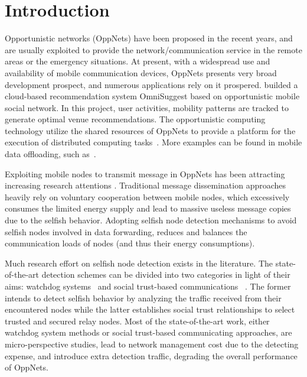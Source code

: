 \section{Introduction}
\label{sec:intro}
Opportunistic networks (OppNets)
have been proposed in the recent years,
and are usually exploited to provide the network/communication service
in the remote areas
or the emergency situations.
At present, with a widespread use and
availability of mobile communication devices,
OppNets presents very broad development prospect,
and numerous applications rely on it prospered.
\cite{DBLP:journals/tsc/KhalidKKZ14} builded a
cloud-based recommendation system OmniSuggest
based on opportunistic mobile social network.
In this project, user activities,
mobility patterns are tracked to
generate optimal venue recommendations.
The opportunistic computing technology utilize
the shared resources of OppNets to
provide a platform for the execution
of distributed computing tasks~\cite{DBLP:journals/tmc/ChatzopoulosAKH18}.
More examples can be found in mobile data offloading,
such as~\cite{DBLP:journals/tmc/HanHKMSS12,
DBLP:journals/tmc/LiQJHW014}.

Exploiting mobile nodes to transmit message in
OppNets has been attracting
increasing research attentions
\cite{DBLP:conf/sigcomm/SouzaMSMCC16,
DBLP:conf/mobicom/RadenkovicH17,
DBLP:journals/comsur/JedariXN18,
DBLP:journals/tmc/LoretiB20}.
Traditional message dissemination approaches
heavily rely on voluntary cooperation between
mobile nodes, which excessively consumes the
limited energy supply and lead to massive useless
message copies due to the selfish behavior.
Adopting selfish node detection mechanisms
to avoid selfish nodes involved in data forwarding,
reduces and balances the communication loads
of nodes (and thus their energy consumptions).

Much research effort on selfish node detection
exists in the literature. The state-of-the-art
detection schemes can be divided into two categories
in light of their aims:
watchdog systems~\cite{DBLP:conf/mobicom/MartiGLB00,
DBLP:journals/tmc/Hernandez-Orallo15,
DBLP:journals/tie/DiasRXM15,
DBLP:journals/fgcs/JedariXCDTA19}
and social trust-based communications
~\cite{DBLP:journals/tpds/ZhuDGDC14,
DBLP:journals/tdsc/ChoC18,
DBLP:journals/tmc/ChoiSLW12}.
The former intends to detect selfish behavior
by analyzing the traffic received
from their encountered nodes
while the latter establishes social trust relationships
to select trusted and secured relay nodes.
Most of the state-of-the-art work,
either watchdog system methods
or social trust-based communicating approaches,
are micro-perspective studies,
lead to network management cost
due to the detecting expense,
and introduce extra detection traffic,
degrading the overall performance of OppNets.


